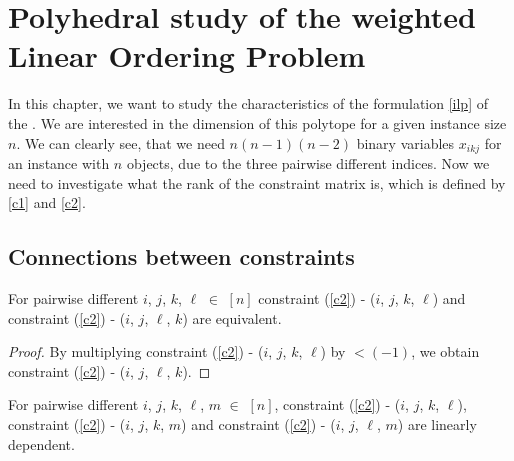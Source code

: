 \chapter{Polyhedral study of the weighted Linear Ordering Problem} \label{chp:poly}

In this chapter, we want to study the characteristics of the \ILP formulation \ref{ilp} of the \wLOP. We are interested in the dimension of this polytope for a given instance size $n$. We can clearly see, that we need $n(n-1)(n-2)$ binary variables $x_{ikj}$ for an instance with $n$ objects, due to the three pairwise different indices. Now we need to investigate what the rank of the constraint matrix is, which is defined by \ref{c1} and \ref{c2}.

\section{Connections between constraints}\label{con-con}

\vspace{0.5 cm}

\begin{lemma}\label{sym}
	For pairwise different $i$, $j$, $k$, $\ell$ $\in$ $[n]$ constraint (\ref{c2}) - ($i$, $j$, $k$, $\ell$) and constraint (\ref{c2}) - ($i$, $j$, $\ell$, $k$) are equivalent.
\end{lemma}

\begin{proof}
	By multiplying constraint (\ref{c2}) - ($i$, $j$, $k$, $\ell$) by $<(-1)$, we obtain constraint (\ref{c2}) - ($i$, $j$, $\ell$, $k$).
	
\end{proof}

\newpage
\begin{lemma} \label{lemtrans}
	For pairwise different $i$, $j$, $k$, $\ell$, $m$ $\in$ $[n]$, constraint (\ref{c2}) - ($i$, $j$, $k$, $\ell$), constraint (\ref{c2}) - ($i$, $j$, $k$, $m$) and constraint (\ref{c2}) - ($i$, $j$, $\ell$, $m$) are linearly dependent.
\end{lemma}

